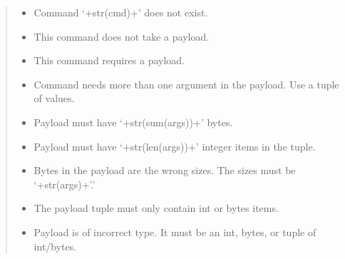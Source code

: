 \documentclass[letterpaper,10pt,english]{sphinxmanual}
\begin{document}
\begin{fulllineitems}
\begin{fulllineitems}
\begin{quote}
\begin{description}
\begin{itemize}
\end{itemize}

\begin{itemize}
\item {} 
\sphinxAtStartPar
{} \textendash{} Command ‘+str(cmd)+’ does not exist.

\item {} 
\sphinxAtStartPar
{} \textendash{} This command does not take a payload.

\item {} 
\sphinxAtStartPar
{} \textendash{} This command requires a payload.

\item {} 
\sphinxAtStartPar
{} \textendash{} Command needs more than one argument in the payload. Use a tuple of values.

\item {} 
\sphinxAtStartPar
{} \textendash{} Payload must have ‘+str(sum(args))+’ bytes.

\item {} 
\sphinxAtStartPar
{} \textendash{} Payload must have ‘+str(len(args))+’ integer items in the tuple.

\item {} 
\sphinxAtStartPar
{} \textendash{} Bytes in the payload are the wrong sizes. The sizes must be ‘+str(args)+’.’

\item {} 
\sphinxAtStartPar
{} \textendash{} The payload tuple must only contain int or bytes items.

\item {} 
\sphinxAtStartPar
{} \textendash{} Payload is of incorrect type. It must be an int, bytes, or tuple of int/bytes.

\end{itemize}

\end{description}\end{quote}

\end{fulllineitems}


\end{fulllineitems}
\end{document}

